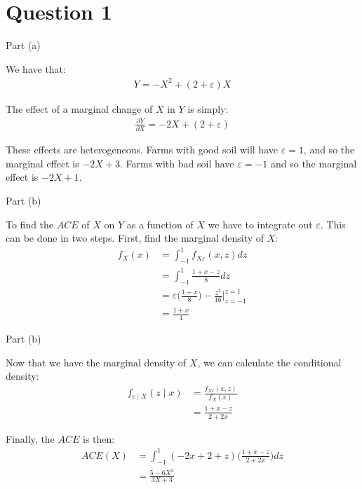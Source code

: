 \section{Question 1}

\begin{frame}{Part (a)}

    We have that:
    \begin{align*}
        Y = -X^2 + (2 + \varepsilon) X
    \end{align*}
    
    The effect of a marginal change of $X$ in $Y$ is simply:
    \begin{align*}
        \frac{\partial Y}{\partial X} = -2 X + (2 + \varepsilon)
    \end{align*}

    These effects are heterogeneous. Farms with good soil will have $\varepsilon = 1$, and so the marginal effect is $-2 X + 3$. Farms with bad soil have $\varepsilon = -1$ and so the marginal effect is $- 2X + 1$.
\end{frame}

\begin{frame}{Part (b)}

    To find the $ACE$ of $X$ on $Y$ as a function of $X$ we have to integrate out $\varepsilon$. This can be done in two steps. First, find the marginal density of $X$:
    \begin{align*}
        f_X(x) &= \int_{-1}^1 f_{X \varepsilon}(x, z) d z
        \\
        &= \int_{-1}^1 \frac{1 + x - z}{8} dz
        \\
        &= \varepsilon \Biggr( \frac{1 + x}{8} \Biggr) - \frac{z^2}{16} \Biggr |_{z=-1}^{z=1}
        \\
        &= \frac{1 + x}{4}
    \end{align*}

\end{frame}

\begin{frame}{Part (b)}

    Now that we have the marginal density of $X$, we can calculate the conditional density:
    \begin{align*}
        f_{\varepsilon \mid X}(z \mid x) &= \frac{f_{X \varepsilon} (x, z) }{f_X (x)}
        \\
        &= \frac{1 + x - z}{2 + 2x}
    \end{align*}

    Finally, the $ACE$ is then:
    \begin{align*}
        ACE(X) &= \int_{-1}^1 (- 2 x + 2 + z) \Biggr( \frac{1 + x - z}{2 + 2x} \Biggr) dz
        \\
        &= \frac{5 - 6X^2}{3X + 3}
    \end{align*}

\end{frame}


